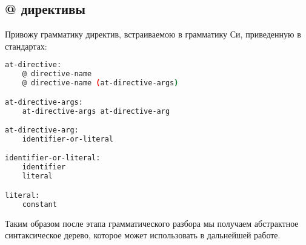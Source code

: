 









\subsection{@ директивы}

Привожу грамматику директив, встраиваемою в грамматику Си, приведенную в стандартах:
\begin{lstlisting}[language=bash, caption={Грамматика @ директив}]
at-directive:
    @ directive-name
    @ directive-name (at-directive-args)

at-directive-args:
    at-directive-args at-directive-arg     

at-directive-arg:
    identifier-or-literal

identifier-or-literal:
    identifier
    literal

literal:
    constant
\end{lstlisting}

Таким образом после этапа грамматического разбора мы получаем абстрактное синтаксическое дерево, которое может использовать в дальнейшей работе.